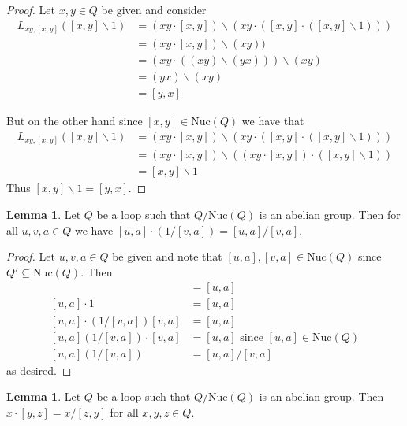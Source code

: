 \documentclass[12pt, twoside, openright]{report}
\theoremstyle{definition}
\newtheorem{lem}[thm]{Lemma}
\newcommand{\ldv}{\backslash}       %
\newcommand{\rdv}{/}                %
\newcommand{\nuc}{\text{Nuc}}       %
\begin{document}
\begin{proof}
  Let $x, y\in Q$ be given and consider
  \begin{align*}
    L_{xy, [x, y]} ([x, y]\ldv 1) &= (xy\cdot [x, y])\ldv(xy\cdot ([x, y]\cdot([x, y]\ldv 1)))\\
    &= (xy\cdot [x, y])\ldv (xy))\\
    &= (xy\cdot ((xy)\ldv (yx)))\ldv (xy)\\
    &= (yx)\ldv (xy)\\
    &= [y, x]
  \end{align*}

  But on the other hand since $[x, y]\in\nuc(Q)$ we have that
  \begin{align*}
    L_{xy, [x, y]}([x, y]\ldv 1) &= (xy\cdot [x, y])\ldv (xy\cdot ([x, y]\cdot([x, y]\ldv 1)))\\
    &= (xy\cdot [x, y])\ldv ((xy\cdot [x, y])\cdot ([x, y]\ldv 1))\\
    &= [x, y]\ldv 1
  \end{align*}
  Thus $[x, y]\ldv 1 = [y, x]$.
\end{proof}

\begin{lem}\label{lem-2}
  Let $Q$ be a loop such that $Q/\nuc(Q)$ is an abelian group. Then for all $u, v, a\in Q$ we have
    $[u, a]\cdot(1\rdv [v, a]) = [u, a]\rdv [v, a]$.
\end{lem}

\begin{proof}
  Let $u, v, a\in Q$ be given and note that $[u, a], [v, a]\in\nuc(Q)$ since $Q'\subseteq \nuc(Q)$. Then
  \begin{align*}
    [u, a] &= [u, a]\\
    [u, a]\cdot 1 &= [u, a]\\
    [u, a]\cdot (1\rdv [v, a])[v, a] &= [u, a]\\
    [u, a](1\rdv [v, a])\cdot [v, a] &= [u, a]\text{ since $[u, a]\in\nuc(Q) $}\\
    [u, a](1\rdv [v, a]) &= [u, a]\rdv[v,a]
  \end{align*}
  as desired.
\end{proof}

\begin{lem}\label{lem-3}
  Let $Q$ be a loop such that $Q/\nuc(Q)$ is an abelian group. Then $x\cdot [y, z] = x\rdv [z, y]$
    for all $x, y, z\in Q$.
\end{lem}
\end{document}
